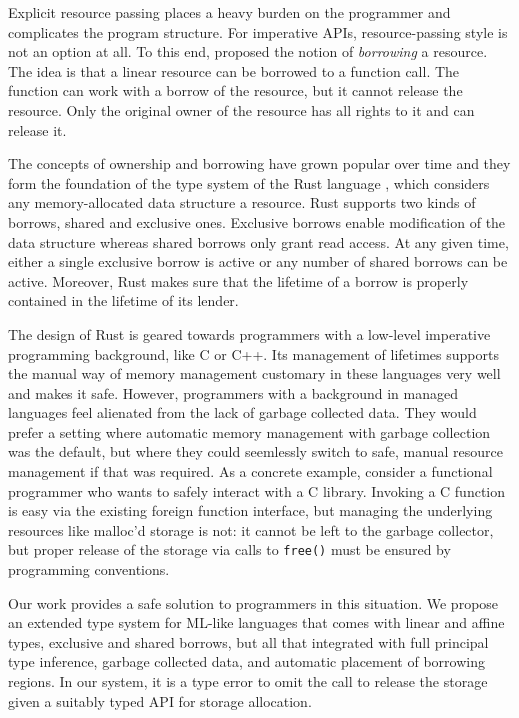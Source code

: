 Explicit resource passing places a heavy burden on the programmer and
complicates the program structure. For imperative APIs,
resource-passing style is not an option at all. To this end,
\citet{DBLP:conf/popl/BoylandR05}  proposed the notion of
\emph{borrowing} a resource. The idea is that a linear resource can be
borrowed to a function call. The function can work with a borrow of
the resource, but it cannot release the resource. Only the original
owner of the resource has all rights to it and can release it.

The concepts of ownership and borrowing have grown popular over time
and they form the foundation of the type system of the Rust language
\cite{rust}, which considers any memory-allocated data structure a
resource. Rust supports two kinds of borrows,
shared and exclusive ones.
Exclusive borrows enable modification of the data structure
whereas shared borrows only grant read access.
At any given time, either a single exclusive borrow is active or
any number of shared borrows can be active.
Moreover, Rust makes sure that the lifetime of a
borrow is properly contained in the lifetime of its lender.

The design of Rust is geared towards programmers with a low-level
imperative programming background, like C or C++. Its management of
lifetimes supports the manual way of memory management customary in
these languages very well and makes it safe. However, programmers with
a background in managed languages feel alienated from the lack of garbage
collected data. They would prefer a setting where automatic memory
management with garbage collection was the default, but where they
could seemlessly switch to safe, manual resource management if that
was required.
%
As a concrete example, consider a functional programmer who wants to
safely interact with a C library. Invoking a C function is easy via
the existing foreign function interface, but managing the underlying
resources like malloc'd storage is not: it cannot be left to the
garbage collector, but proper release of the storage via calls to \texttt{free()} must be
ensured by programming conventions.

Our work provides a safe solution to programmers in this situation. We
propose an extended type system for ML-like languages that comes with
linear and affine types, exclusive and shared borrows, but all that
integrated with full principal type inference, garbage collected data, and
automatic placement of borrowing regions.
In our system, it is a type error to omit the call to release the
storage given a suitably typed API for storage allocation.

